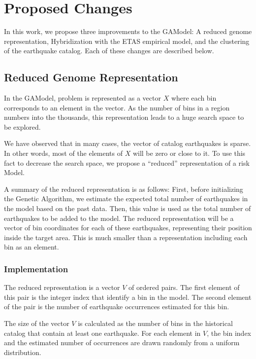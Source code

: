\section{Proposed Changes}
\label{sec:adaptations}

In this work, we propose three improvements to the GAModel: A reduced
genome representation, Hybridization with the ETAS empirical model,
and the clustering of the earthquake catalog. Each of these changes
are described below.

\subsection{Reduced Genome Representation}

In the GAModel, problem is represented as a vector $X$ where each bin
corresponds to an element in the vector. As the number of bins in a
region numbers into the thousands, this representation leads to a huge
search space to be explored.

We have observed that in many cases, the vector of catalog
earthquakes is sparse. In other words, most of the elements of $X$
will be zero or close to it. To use this fact to decrease the
search space, we propose a ``reduced'' representation of a risk Model.

A summary of the reduced representation is as follows: First, before
initializing the Genetic Algorithm, we estimate the expected total
number of earthquakes in the model based on the past data. Then, this
value is used as the total number of earthquakes to be added to the
model. The reduced representation will be a vector of bin coordinates
for each of these earthquakes, representing their position inside the
target area. This is much smaller than a representation including each
bin as an element.


\subsubsection*{Implementation}

The reduced representation is a vector $V$ of ordered pairs. The first
element of this pair is the integer index that identify a bin in the
model. The second element of the pair is the number of earthquake
occurrences estimated for this bin.

The size of the vector $V$ is calculated as the number of bins in the
historical catalog that contain at least one earthquake. For each
element in $V$, the bin index and the estimated number of occurrences
are drawn randomly from a uniform distribution.

